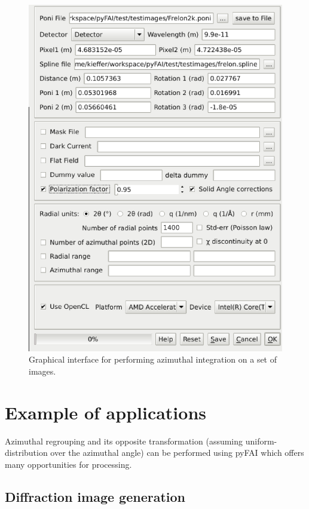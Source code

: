 \documentclass[preprint]{iucr}
\begin{document}
\begin{figure}
\label{pyFAI-integrate}
\begin{center}
\includegraphics[width=15cm]{integrate.eps}
\caption{Graphical interface for performing azimuthal integration on a set of
images.}
\end{center}
\end{figure}

\section{Example of applications}

Azimuthal regrouping and its opposite transformation (assuming
uniform-distribution over the azimuthal angle) can be performed
using pyFAI which offers many opportunities for processing.

\subsection{Diffraction image generation}
\end{document}
